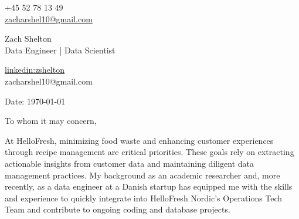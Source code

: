 \documentclass[11pt,a4]{article}
\begin{document}
\begin{center}
    \begin{minipage}[b]{0.24\textwidth}
            \large +45 52 78 13 49 \\
            \large \href{mailto:zacharshel10@gmail.com}{zacharshel10@gmail.com} 
    \end{minipage}%
    \begin{minipage}[b]{0.5\textwidth}
            \centering
            {\Huge Zach Shelton} \\ %
            \vspace{0.1cm}
            {\color{UI_blue} \Large{Data Engineer | Data Scientist}} \\
    \end{minipage}%
    \begin{minipage}[b]{0.24\textwidth}
            \flushright \large
            {\href{https://www.linkedin.com/in/zshelton/}{linkedin:zshelton} } \\
            zacharshel10@gmail.com
    \end{minipage}   
    
\vspace{-0.15cm} 
{\color{UI_blue} \hrulefill}
\end{center}

\justify
\setlength{\parindent}{0pt}
\setlength{\parskip}{12pt}
\vspace{0.1cm}


Date: \today \par \vspace{-0.1cm}

To whom it may concern,

At HelloFresh, minimizing food waste and enhancing customer experiences through recipe management are critical priorities. These goals rely on extracting actionable insights from customer data and maintaining diligent data management practices. My background as an academic researcher and, more recently, as a data engineer at a Danish startup has equipped me with the skills and experience to quickly integrate into HelloFresh Nordic’s Operations Tech Team and contribute to ongoing coding and database projects.
\end{document}
